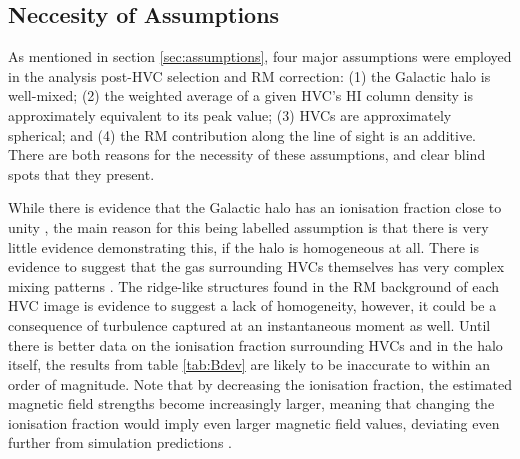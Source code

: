 \subsection{Neccesity of Assumptions}
\label{ssec:B2}

As mentioned in section \ref{sec:assumptions}, four major assumptions were employed in the analysis post-HVC selection and RM correction: (1) the Galactic halo is well-mixed; (2) the weighted average of a given HVC's HI column density is approximately equivalent to its peak value; (3) HVCs are approximately spherical; and (4) the RM contribution along the line of sight is an additive. There are both reasons for the necessity of these assumptions, and clear blind spots that they present.


While there is evidence that the Galactic halo has an ionisation fraction close to unity \citep{ID23}, the main reason for this being labelled assumption is that there is very little evidence demonstrating this, if the halo is homogeneous at all. There is evidence to suggest that the gas surrounding HVCs themselves has very complex mixing patterns \cite{ID69}. The ridge-like structures found in the RM background of each HVC image is evidence to suggest a lack of homogeneity, however, it could be a consequence of turbulence captured at an instantaneous moment as well. Until there is better data on the ionisation fraction surrounding HVCs and in the halo itself, the results from table \ref{tab:Bdev} are likely to be inaccurate to within an order of magnitude. Note that by decreasing the ionisation fraction, the estimated magnetic field strengths become increasingly larger, meaning that changing the ionisation fraction would imply even larger magnetic field values, deviating even further from simulation predictions \citep{ID24}.


